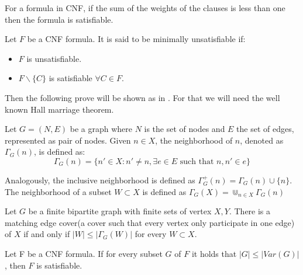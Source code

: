 \begin{corollary}
	For a formula in CNF, if the sum of the weights of the clauses is less than one then the formula is satisfiable.
\end{corollary}





\begin{definition}
Let $F$ be a CNF formula. It is said to be minimally unsatisfiable if:
\begin{itemize}
	\item $F$ is unsatisfiable.
	\item $F\backslash \{C\}$ is satisfiable $\forall C \in F$.
\end{itemize}
\end{definition}


Then the following prove will be shown as in \cite{schoning2013satisfiability}. For that we will need the well known Hall marriage theorem\cite{hall2009representatives}.

\begin{definition}
  Let $G=(N,E)$ be a graph where $N$ is the set of nodes and $E$ the set of edges, represented as pair of nodes. Given $n \in X$,  the neighborhood of $n$, denoted as $\Gamma_G(n)$, is defined as:
	$$ \Gamma_G(n) = \{ n' \in X : n'\ne n, \exists e \in E \text{ such that } n,n' \in e\}$$
	
        Analogously, the inclusive neighborhood is defined as $\Gamma_G^+(n) = \Gamma_G(n) \cup \{n\}$. The neighborhood of a subset $W \subset X$ is defined as $\Gamma_G(X) = \Cup_{n\in X} \Gamma_G(n)$
\end{definition}


\begin{theorem}
  Let $G$ be a finite bipartite graph with finite sets of vertex $X,Y$. There is a matching edge cover(a cover such that every vertex only participate in one edge) of $X$ if and only if $|W| \le |\Gamma_G(W)|$ for every $W\subset X$.  
\end{theorem}


\begin{lemma}
Let F be a CNF formula. If for every subset $G$ of $F$ it holds that $|G|\le |Var(G)|$, then $F$ is satisfiable.
\end{lemma}

